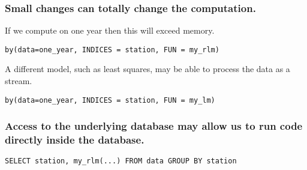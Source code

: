\documentclass{beamer}
\begin{document}
\begin{frame}[fragile]

    \frametitle{Small changes can totally change the
    computation.}


    If we compute on one year then this will exceed memory.

\begin{verbatim}
by(data=one_year, INDICES = station, FUN = my_rlm)
\end{verbatim}

\pause 

    A different model, such as least squares, may be able to process the
    data as a stream.

\begin{verbatim}
by(data=one_year, INDICES = station, FUN = my_lm)
\end{verbatim}

\end{frame}
\begin{frame}[fragile]

    \frametitle{Access to the underlying database may allow us to run code directly inside the
    database.}

\begin{verbatim}
SELECT station, my_rlm(...) FROM data GROUP BY station
\end{verbatim}


%
%

\end{frame}
\end{document}

